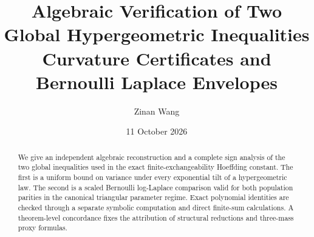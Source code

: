 \documentclass[11pt,a4paper]{article}
\title{Algebraic Verification of Two Global Hypergeometric Inequalities\\\large Curvature Certificates and Bernoulli Laplace Envelopes}
\author{Zinan Wang}
\date{11 October 2026}
\begin{document}
\maketitle
\begin{abstract}
We give an independent algebraic reconstruction and a complete sign analysis of the two global inequalities used in the exact finite-exchangeability Hoeffding constant. The first is a uniform bound on variance under every exponential tilt of a hypergeometric law. The second is a scaled Bernoulli log-Laplace comparison valid for both population parities in the canonical triangular parameter regime. Exact polynomial identities are checked through a separate symbolic computation and direct finite-sum calculations. A theorem-level concordance fixes the attribution of structural reductions and three-mass proxy formulas.
\end{abstract}
\end{document}
